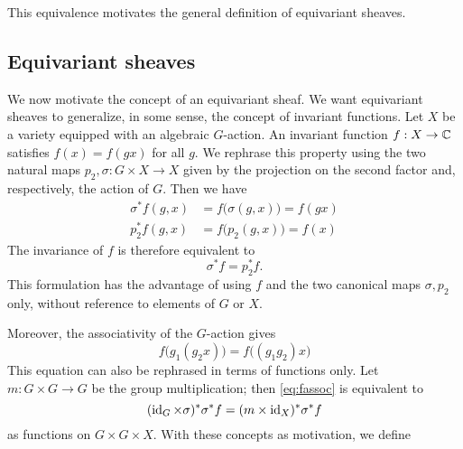 This equivalence motivates the general definition of equivariant sheaves.

\subsection{Equivariant sheaves}

We now motivate the concept of an equivariant sheaf.
We want equivariant sheaves to generalize, in some sense, the concept of invariant functions. Let $X$ be a variety
equipped with an algebraic $G$-action. An invariant function $f: X \to \mathbb{C}$ satisfies $f(x) = f(gx)$ for all $g$.
We rephrase this property using the two natural maps $p_2,\sigma : G\times X \to X$ given by the projection on the second
factor and, respectively, the action of $G$. Then we have
\begin{align*}
\sigma^* f(g,x) &= f\big(\sigma(g,x)\big) = f(gx) \\
p_2^* f(g,x) &= f\big(p_2(g,x)\big) = f(x)
\end{align*}
The invariance of $f$ is therefore equivalent to
\begin{equation}
\label{eq:finv}
\sigma^*f = p_2^*f .
\end{equation}
This formulation has the advantage of using $f$ and
the two canonical maps $\sigma,p_2$ only, without reference to elements of $G$ or $X$.

Moreover, the associativity of the $G$-action gives
\begin{equation}
\label{eq:fassoc}
f\big(g_1(g_2x)\big) = f\big((g_1g_2)x\big)
\end{equation}
This equation can also be rephrased in terms of functions only. Let $m: G\times G \to G$
be the group multiplication; then \ref{eq:fassoc} is equivalent to
\begin{equation}
\label{eq:fcoc}
(\operatorname{id}_G \times \sigma)^* \sigma^* f = (m \times \operatorname{id}_X)^* \sigma^* f
\end{equation}
as functions on $G \times G \times X$. With these concepts as motivation, we define


